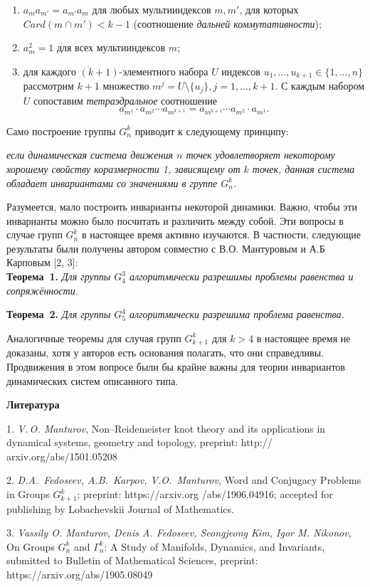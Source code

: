 \begin{enumerate}
	\item $a_{m}a_{m'}=a_{m'}a_{m}$ для любых мультииндексов $m, m'$, для которых $Card(m\cap m') < k-1$ (соотношение {\em дальней коммутативности});
	\item $a_m^2=1$ для всех мультииндексов $m$;
	\item для каждого $(k+1)$-элементного набора $U$ индексов $u_{1},\dots, u_{k+1} \in \{1,\dots, n\}$ рассмотрим $k+1$ множество $m^{j}=U\setminus \{u_{j}\}, j=1,\dots, k+1$. С каждым набором $U$ сопоставим {\em тетраэдральное} соотношение $$a_{m^1}\cdot a_{m^2}\cdots a_{m^{k+1}}= a_{m^{k+1}}\cdots a_{m^2}\cdot a_{m^1}.$$
\end{enumerate}

Само построение группы $G_n^k$ приводит к следующему принципу:

\begin{center}
	{\em если динамическая система движения $n$ точек удовлетворяет некоторому хорошему свойству коразмерности 1, зависящему от $k$ точек, данная система обладает инвариантами со значениями в группе $G_n^k$.}
\end{center}

Разумеется, мало построить инварианты некоторой динамики. Важно, чтобы эти инварианты можно было посчитать и различить между собой. Эти вопросы в случае групп $G_n^k$ в настоящее время активно изучаются. В частности, следующие результаты были получены автором совместно с В.О. Мантуровым и А.Б Карповым [2, 3]: \\

\textbf{Теорема~1.} {\it Для группы $G_4^3$ алгоритмически разрешимы проблемы равенства и сопряжённости.}

\textbf{Теорема~2.} {\it Для группы $G_5^4$ алгоритмически разрешима проблема равенства.}

Аналогичные теоремы для случая групп $G_{k+1}^k$ для $k>4$ в настоящее время не доказаны, хотя у авторов есть основания полагать, что они справедливы. Продвижения в этом вопросе были бы крайне важны для теории инвариантов динамических систем описанного типа.


\smallskip \centerline {\bf Литература} \nopagebreak


1. {\it V.\,O. Manturov}, Non--Reidemeister knot theory and its applications in dynamical systems, geometry and topology, preprint: http:// arxiv.org/abs/1501.05208

2. {\it D.A.~Fedoseev, A.B.~Karpov, V.O.~Manturov}, Word and Conjugacy Problems in Groups $G_{k+1}^{k}$; preprint: https://arxiv.org /abs/1906.04916; accepted for publishing by Lobachevskii Journal of Mathematics.

3. {\it Vassily O. Manturov, Denis A. Fedoseev, Seongjeong Kim, Igor M. Nikonov}, On Groups $G^k_n$ and $\Gamma^k_n$: A Study of Manifolds, Dynamics, and Invariants, submitted to Bulletin of Mathematical Sciences, preprint: https://arxiv.org/abs/1905.08049
